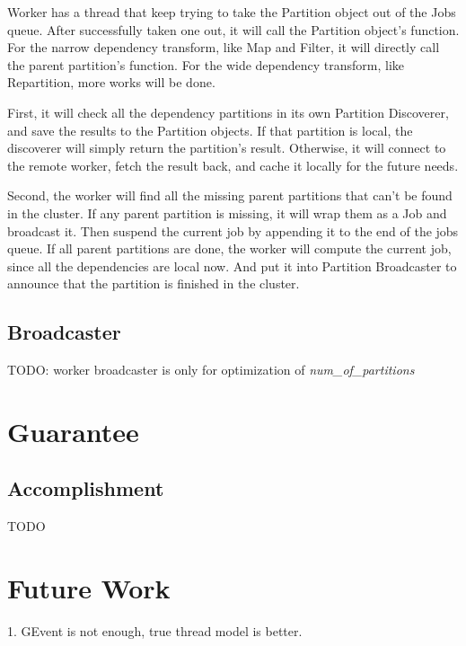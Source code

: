 Worker has a thread that keep trying to take the Partition object out of the Jobs queue.
After successfully taken one out, it will call the Partition object's function.
For the narrow dependency transform, like Map and Filter, it will directly call the parent partition's function.
For the wide dependency transform, like Repartition, more works will be done.

First, it will check all the dependency partitions in its own Partition Discoverer,
and save the results to the Partition objects.
If that partition is local, the discoverer will simply return the partition's result.
Otherwise, it will connect to the remote worker, fetch the result back, and cache it locally for the future needs.

Second, the worker will find all the missing parent partitions that can't be found in the cluster.
If any parent partition is missing, it will wrap them as a Job and broadcast it.
Then suspend the current job by appending it to the end of the jobs queue.
If all parent partitions are done, the worker will compute the current job, since all the dependencies are local now.
And put it into Partition Broadcaster to announce that the partition is finished in the cluster.

\subsection{Broadcaster} %
\label{sub:broadcaster}
TODO: worker broadcaster is only for optimization of \emph{num\_of\_partitions}



\section{Guarantee} %
\label{sec:guarantee}

\subsection{Accomplishment} %
\label{sub:accomplishment}
TODO



\section{Future Work} %
\label{sec:future_work}
1. GEvent is not enough, true thread model is better.


